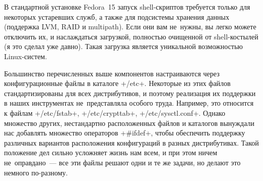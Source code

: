 \documentclass[10pt,oneside,a4paper]{article}
\begin{document}
В стандартной установке Fedora~15 запуск shell-скриптов требуется только для
некоторых устаревших служб, а также для подсистемы хранения данных (поддержка
LVM, RAID и multipath). Если они вам не~нужны, вы легко можете отключить их, и
наслаждаться загрузкой, полностью очищенной от shell-костылей (я это сделал уже
давно). Такая загрузка является уникальной возможностью Linux-систем.

Большинство перечисленных выше компонентов настраиваются через конфигурационные
файлы в каталоге +/etc+. Некоторые из этих файлов стандартизированы для всех
дистрибутивов, и поэтому реализация их поддержки в наших инструментах
не~представляла особого труда. Например, это относится к файлам +/etc/fstab+,
+/etc/crypttab+, +/etc/sysctl.conf+. Однако множество других, нестандартно
расположенных файлов и каталогов вынуждали нас добавлять множество операторов
+#ifdef+, чтобы обеспечить поддержку различных вариантов расположения
конфигураций в разных дистрибутивах. Такой положение дел сильно усложняет
жизнь нам всем, и при этом ничем не~оправдано~--- все эти файлы решают одни и те
же задачи, но делают это немного по-разному.
\end{document}
